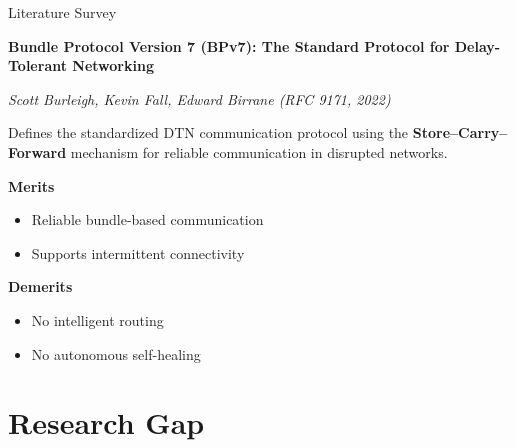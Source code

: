 \documentclass[11pt,aspectratio=43]{beamer}
\begin{document}
\begin{frame}{Literature Survey}

\textbf{Bundle Protocol Version 7 (BPv7): The Standard Protocol for Delay-Tolerant Networking}

\textit{Scott Burleigh, Kevin Fall, Edward Birrane (RFC 9171, 2022)}

\vspace{0.2cm}

Defines the standardized DTN communication protocol using the \textbf{Store--Carry--Forward} mechanism for reliable communication in disrupted networks.

\vspace{0.2cm}

\textbf{Merits}
\begin{itemize}
    \item Reliable bundle-based communication
    \item Supports intermittent connectivity
\end{itemize}

\textbf{Demerits}
\begin{itemize}
    \item No intelligent routing
    \item No autonomous self-healing
\end{itemize}

\end{frame}

\section{Research Gap}
\end{document}

